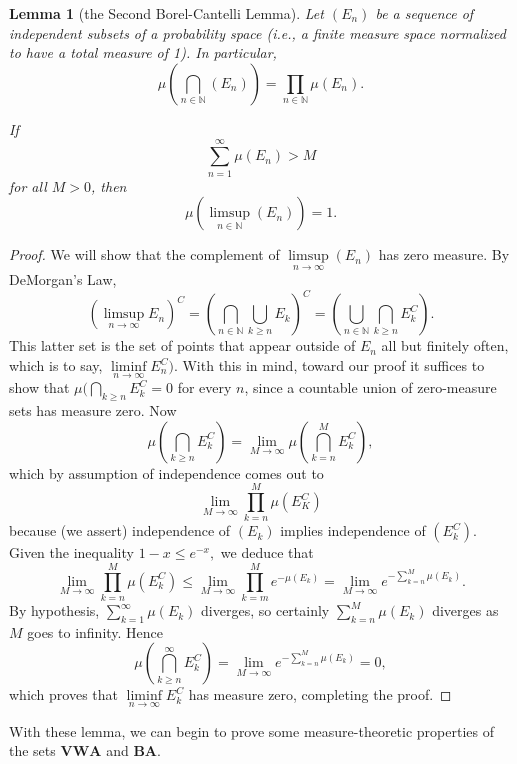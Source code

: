 \documentclass[12pt, letterpaper, oneside]{book}
\newcommand{\N}{\mathbb{N}}
\theoremstyle{plain}
\newtheorem{lemma}[theorem]{Lemma}
\theoremstyle{definition}
\theoremstyle{remark}
\begin{document}
\begin{lemma}[the Second Borel-Cantelli Lemma]
Let $(E_n)$ be a sequence of independent subsets of a probability space (i.e., a finite measure space normalized to have a total measure of 1). In particular,
\[
\mu(\bigcap_{n \in \N}(E_n)) = \prod_{n \in \N} \mu(E_n).
\]

If
\[
\sum_{n=1}^\infty \mu(E_n) > M
\]
for all $M > 0$, then
\[
\mu (\limsup\limits_{n \in \N}(E_n)) = 1.
\]
\end{lemma}
\begin{proof}
We will show that the complement of $\limsup\limits_{n \to \infty} (E_n)$ has zero measure. By DeMorgan's Law,
\[
(\limsup_{n \to \infty} E_n)^C = (\bigcap_{n \in \N} \bigcup_{k \geq n} E_k)^C = (\bigcup_{n \in \N} \bigcap_{k \geq n} E^C_k).
\]
This latter set is the set of points that appear outside of $E_n$ all but finitely often, which is to say, $\liminf \limits_{n \to \infty} E_n^C).$ With this in mind, toward our proof it suffices to show that $\mu (\bigcap_{k\geq n} E_k^C = 0$ for every $n$, since a countable union of zero-measure sets has measure zero. Now
\[
\mu (\bigcap_{k\geq n} E_k^C) = \lim \limits_{M \to \infty} \mu(\bigcap_{k = n}^M E_k^C), 
\]
which by assumption of independence comes out to
\[
\lim_{M \to \infty} \prod_{k = n}^M \mu(E_K^C)
\]
because (we assert) independence of $(E_k)$ implies independence of $(E_k^C).$ Given the inequality $1 - x \leq e^{-x},$ we deduce that 
\[
\lim_{M \to \infty} \prod_{k = n}^M \mu(E_k^C) \leq \lim_{M \to \infty} \prod_{k = m}^M e^{-\mu(E_k)} = \lim_{M \to \infty} e^{-\sum_{k = n}^M \mu(E_k)}.
\]
By hypothesis, $\sum_{k = 1}^{\infty} \mu(E_k)$ diverges, so certainly $\sum_{k = n}^M \mu(E_k)$ diverges as $M$ goes to infinity. Hence
\[
\mu(\bigcap_{k \geq n}^\infty E_k^C) = \lim_{M \to \infty} e^{-\sum_{k = n}^M \mu(E_k)} = 0,
\]
which proves that $\liminf \limits_{n \to \infty} E_k^C$ has measure zero, completing the proof. 
\end{proof}

With these lemma, we can begin to prove some measure-theoretic properties of the sets $\mathbf{VWA}$ and $\mathbf{BA}.$
\end{document}
